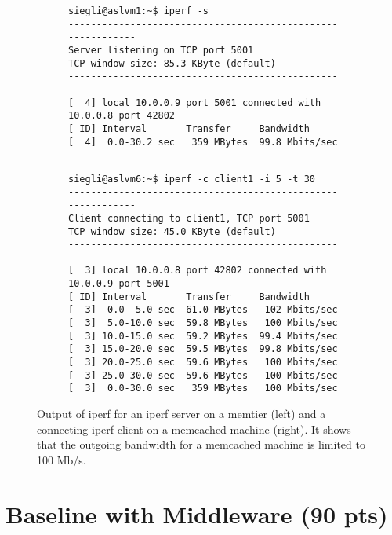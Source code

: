 \documentclass[11pt,a4paper]{article}
\makeatletter
\newcommand{\verbatimfont}[1]{\renewcommand{\verbatim@font}{\ttfamily#1}}
\makeatother
\begin{document}
\verbatimfont{\tiny}%
\begin{figure}[H]
\centering
\begin{subfigure}[t]{.5\textwidth}
  
    \begin{verbatim}
siegli@aslvm1:~$ iperf -s
------------------------------------------------------------
Server listening on TCP port 5001
TCP window size: 85.3 KByte (default)
------------------------------------------------------------
[  4] local 10.0.0.9 port 5001 connected with 10.0.0.8 port 42802
[ ID] Interval       Transfer     Bandwidth
[  4]  0.0-30.2 sec   359 MBytes  99.8 Mbits/sec


\end{verbatim}
\end{subfigure}%
\begin{subfigure}[t]{.5\textwidth}
 
    \begin{verbatim}
siegli@aslvm6:~$ iperf -c client1 -i 5 -t 30
------------------------------------------------------------
Client connecting to client1, TCP port 5001
TCP window size: 45.0 KByte (default)
------------------------------------------------------------
[  3] local 10.0.0.8 port 42802 connected with 10.0.0.9 port 5001
[ ID] Interval       Transfer     Bandwidth
[  3]  0.0- 5.0 sec  61.0 MBytes   102 Mbits/sec
[  3]  5.0-10.0 sec  59.8 MBytes   100 Mbits/sec
[  3] 10.0-15.0 sec  59.2 MBytes  99.4 Mbits/sec
[  3] 15.0-20.0 sec  59.5 MBytes  99.8 Mbits/sec
[  3] 20.0-25.0 sec  59.6 MBytes   100 Mbits/sec
[  3] 25.0-30.0 sec  59.6 MBytes   100 Mbits/sec
[  3]  0.0-30.0 sec   359 MBytes   100 Mbits/sec

\end{verbatim}
\end{subfigure}
\caption{Output of iperf for an iperf server on a memtier (left) and a connecting iperf client on a memcached machine (right). It shows that the outgoing bandwidth for a memcached machine is limited to 100 Mb/s.}
\label{fig:bl:iperf_server_cl}
\end{figure}



\section{Baseline with Middleware (90 pts)}\label{sec:bl_with_mw}
\end{document}
